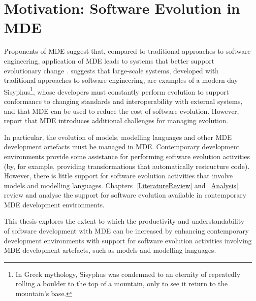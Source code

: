 
\section{Motivation: Software Evolution in MDE}
Proponents of MDE suggest that, compared to traditional approaches to software engineering, application of MDE leads to systems that better support evolutionary change \cite{kleppe03mda}. \cite{frankel02mda} suggests that large-scale systems, developed with traditional approaches to software engineering, are examples of a  modern-day Sisyphus\footnote{In Greek mythology, Sisyphus was condemned to an eternity of repeatedly rolling a boulder to the top of a mountain, only to see it return to the mountain's base.}, whose developers must constantly perform evolution to support conformance to changing standards and interoperability with external systems, and that MDE can be used to reduce the cost of software evolution. However, \cite{Mens07} report that MDE introduces additional challenges for managing evolution.

In particular, the evolution of models, modelling languages and other MDE development artefacts must be managed in MDE. Contemporary development environments provide some assistance for performing software evolution activities (by, for example, providing transformations that automatically restructure code). However, there is little support for software evolution activities that involve models and modelling languages. Chapters~\ref{LiteratureReview} and~\ref{Analysis} review and analyse the support for software evolution available in contemporary MDE development environments.


This thesis explores the extent to which the productivity and understandability of software development with MDE can be increased by enhancing contemporary development environments with support for software evolution activities involving MDE development artefacts, such as models and modelling languages.
